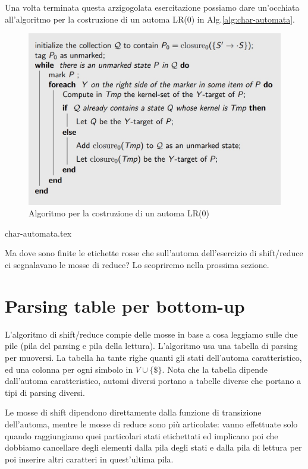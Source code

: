 \documentclass[class=book, crop=false, oneside, 12pt]{standalone}
\begin{document}
Una volta terminata questa arzigogolata esercitazione possiamo dare un'occhiata all'algoritmo per la costruzione di un automa LR(0) in Alg.\ref{alg:char-automata}. \\
\begin{figure}
    \centering
    \includegraphics[width=.8\textwidth]{lr0-automata_construction_algorithm.jpg}
    \caption{Algoritmo per la costruzione di un automa LR(0)}
    \label{lr0-automata_construction_algorithm}    
\end{figure}
{char-automata.tex}

Ma dove sono finite le etichette rosse che sull'automa dell'esercizio di shift/reduce ci segnalavano le mosse di reduce? Lo scopriremo nella prossima sezione.

\section{Parsing table per bottom-up}
L'algoritmo di shift/reduce compie delle mosse in base a cosa leggiamo sulle due pile (pila del parsing e pila della lettura). L'algoritmo usa una tabella di parsing per muoversi. La tabella ha tante righe quanti gli stati dell'automa caratteristico, ed una colonna per ogni simbolo in \(V \cup \{ \$ \}\). Nota che la tabella dipende dall'automa caratteristico, automi diversi portano a tabelle diverse che portano a tipi di parsing diversi.

Le mosse di shift dipendono direttamente dalla funzione di transizione dell'automa, mentre le mosse di reduce sono più articolate: vanno effettuate solo quando raggiungiamo quei particolari stati etichettati ed implicano poi che dobbiamo cancellare degli elementi dalla pila degli stati e dalla pila di lettura per poi inserire altri caratteri in quest'ultima pila.
\end{document}
